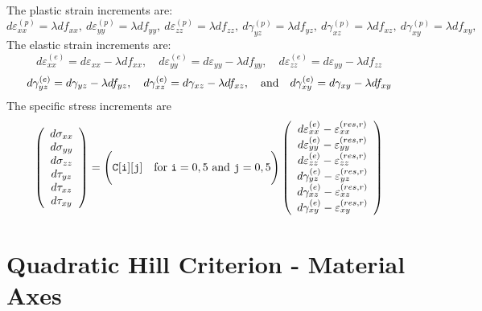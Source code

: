 \documentclass[11pt]{book}
\def\code#1{{\small\tt #1}}
\def\err#1{\varepsilon_{#1}^{(res,r)}}
\def\fvvec#1#2#3#4#5#6{\left(\begin{array}{ccc} #1 \\ #2 \\ #3 \\ #4 \\ #5 \\ #6 \end{array}\right)}
\def\g#1{\gamma_{#1}}
\def\s#1{\sigma_{#1}}
\def\t#1{\tau_{#1}}
\begin{document}
 The plastic strain increments are:
\begin{equation}
       d\varepsilon_{xx}^{(p)} = \lambda df_{xx}, \ 
       d\varepsilon_{yy}^{(p)} = \lambda df_{yy}, \ 
       d\varepsilon_{zz}^{(p)} = \lambda df_{zz}, \ 
       d\gamma_{yz}^{(p)} =  \lambda df_{yz}, \ 
       d\gamma_{xz}^{(p)} =  \lambda df_{xz}, \ 
       d\gamma_{xy}^{(p)} =  \lambda df_{xy},
\end{equation}
The elastic strain increments are:
\begin{equation}
       d\varepsilon_{xx}^{(e)} = d\varepsilon_{xx} -\lambda df_{xx}, \quad
       d\varepsilon_{yy}^{(e)} = d\varepsilon_{yy} -\lambda df_{yy}, \quad
       d\varepsilon_{zz}^{(e)} =  d\varepsilon_{yy} -\lambda df_{zz}
\end{equation}
\begin{equation}
       d\gamma_{yz}^{(e)} = d\gamma_{yz} -  \lambda df_{yz}, \quad 
       d\gamma_{xz}^{(e)} = d\gamma_{xz} -  \lambda df_{xz}, \quad  {\rm and} \quad
       d\gamma_{xy}^{(e)} = d\gamma_{xy} -  \lambda df_{xy}
\end{equation}
The specific stress increments are
\begin{equation}
      \fvvec{d\s{xx}}{d\s{yy}}{d\s{zz}}{d\t{yz}}{d\t{xz}}{d\t{xy}} = \Biggl(\code{C[i][j]} \quad {\rm for\ }\code{i}=0,5\ {\rm and\ }\code{j}=0,5\Biggr)
          \fvvec{d\varepsilon_{xx}^{(e)}  - \err{xx}}{d\varepsilon_{yy}^{(e)}  -\err{yy}}{d\varepsilon_{zz}^{(e)}  -\err{zz}}
                             {d\g{yz}^{(e)}-\err{yz}}{d\g{xz}^{(e)}-\err{xz}}{d\g{xy}^{(e)}-\err{xy}}
 \end{equation}

\section{Quadratic Hill Criterion - Material Axes}
\end{document}
